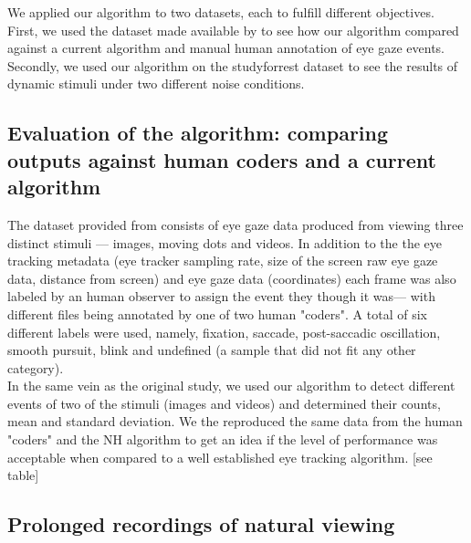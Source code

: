 \documentclass[10pt,a4paper]{extarticle}
\begin{document}
We applied our algorithm to two datasets, each to fulfill different objectives. First, we used the dataset made available by \citet{Andersson2017} to see how our algorithm compared against a current algorithm and manual human annotation of eye gaze events. Secondly, we used our algorithm on the studyforrest dataset \cite{Hanke2016} to see the results of dynamic stimuli under two different noise conditions.

\subsection*{Evaluation of the algorithm: comparing outputs against human coders and a current algorithm}

The dataset provided from \citet{Andersson2017} consists of eye gaze data produced from viewing three distinct stimuli --- images, moving dots and videos. In addition to the the eye tracking metadata (eye tracker sampling rate, size of the screen raw eye gaze data, distance from screen) and eye gaze data (coordinates) each frame was also labeled by an human observer to assign the event they though it was--- with different files being annotated by one of two human "coders". A total of six different labels were used, namely, fixation, saccade, post-saccadic oscillation, smooth pursuit, blink and undefined (a sample that did not fit any other category). \\

In the same vein as the original study, we used our algorithm to detect different events of two of the stimuli (images and videos) and determined their counts, mean and standard deviation. We the reproduced the same data from the human "coders" and the NH algorithm \citep{Nystrom2010AnData} to get an idea if the level of performance was acceptable when compared to a well established eye tracking algorithm. [see table]  





\subsection*{Prolonged recordings of natural viewing}
\end{document}
